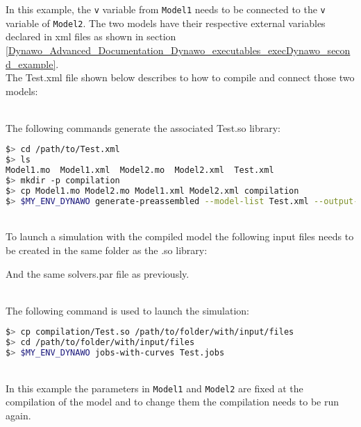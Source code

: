 \documentclass[a4paper, 12pt]{report}
\begin{document}
In this example, the \lstinline[language=Modelica]{v} variable from
\lstinline[language=Modelica]{Model1} needs to be connected to the \lstinline[language=Modelica]{v} variable of \lstinline[language=Modelica]{Model2}. 
The two models have their respective external variables declared in xml files as shown in section \ref{Dynawo_Advanced_Documentation_Dynawo_executables_execDynawo_second_example}.\\

The Test.xml file shown below describes to \Dynawo how to compile and connect those two models:


~~\\
The following commands generate the associated Test.so library:
\begin{lstlisting}[language=bash,deletekeywords={jobs,help}]
$> cd /path/to/Test.xml
$> ls
Model1.mo  Model1.xml  Model2.mo  Model2.xml  Test.xml
$> mkdir -p compilation
$> cp Model1.mo Model2.mo Model1.xml Model2.xml compilation
$> $MY_ENV_DYNAWO generate-preassembled --model-list Test.xml --output-dir compilation --non-recursive-modelica-models-dir .
\end{lstlisting}

~~\\
To launch a simulation with the compiled model the following input files needs to be created in the same folder as the .so library:



And the same solvers.par file as previously. 

~~\\
The following command is used to launch the simulation:
\begin{lstlisting}[language=bash,deletekeywords={jobs,help}]
$> cp compilation/Test.so /path/to/folder/with/input/files
$> cd /path/to/folder/with/input/files
$> $MY_ENV_DYNAWO jobs-with-curves Test.jobs
\end{lstlisting}

~~\\
In this example the parameters in \lstinline[language=Modelica]{Model1} and \lstinline[language=Modelica]{Model2} are fixed at the compilation of the model and to change them the compilation needs to be run again.
\end{document}
